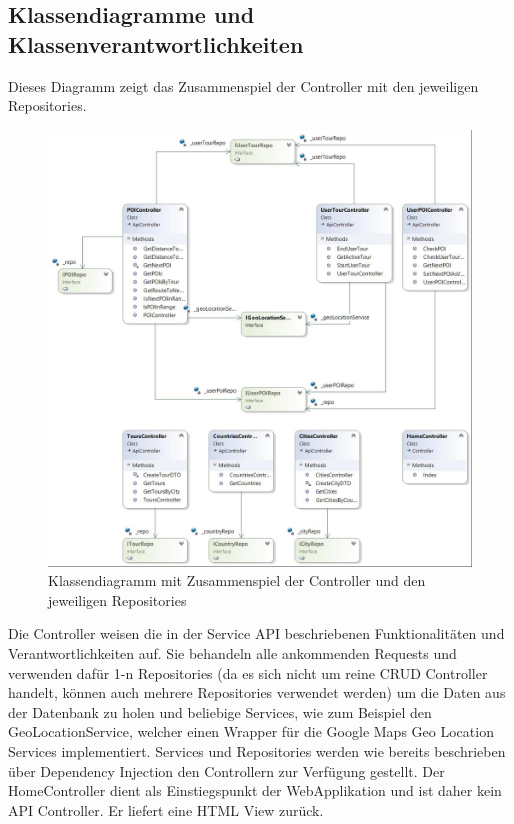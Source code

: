 \documentclass[a4paper,10pt,xetex]{article}
\begin{document}
\newpage
\subsection{Klassendiagramme und Klassenverantwortlichkeiten}\label{klassendiagramme}
Dieses Diagramm zeigt das Zusammenspiel der Controller mit den jeweiligen Repositories.

\begin{figure}
  \centering
  \includegraphics{klassendiagramm_backend1}
  \caption{Klassendiagramm mit Zusammenspiel der Controller und den jeweiligen Repositories}
\end{figure}

Die Controller weisen die in der Service API beschriebenen Funktionalit\"aten und Verantwortlichkeiten auf. Sie
behandeln alle ankommenden Requests und verwenden daf\"ur 1-n Repositories (da es sich nicht um reine CRUD Controller
handelt, k\"onnen auch mehrere Repositories verwendet werden) um die Daten aus der Datenbank zu holen und beliebige
Services, wie zum Beispiel den GeoLocationService, welcher einen Wrapper f\"ur die Google Maps Geo Location Services
implementiert. Services und Repositories werden wie bereits beschrieben \"uber Dependency Injection den Controllern zur
Verf\"ugung gestellt. Der HomeController dient als Einstiegspunkt der WebApplikation und ist daher kein API Controller.
Er liefert eine HTML View zur\"uck.
\end{document}
